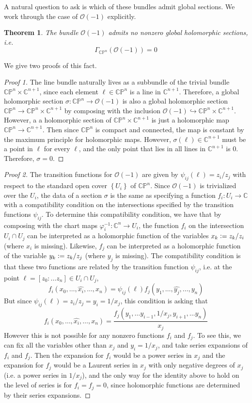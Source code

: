 \documentclass[psamsfonts, 12pt]{amsart}
\newtheorem{thm}{Theorem}[section]
\theoremstyle{definition}
\theoremstyle{remark}
\renewcommand{\O}{\mathscr{O}}
\newcommand{\C}{\mathbb{C}}
\newcommand{\CP}{\mathbb{CP}}
\newcommand{\inv}{^{-1}}
\newcommand{\set}[1]{\left\lbrace #1 \right\rbrace}
\newcommand{\defeq}{\vcentcolon=}
\begin{document}
A natural question to ask is which of these bundles admit global sections. We work
through the case of $\O(-1)$ explicitly.
%
\begin{thm}
The bundle $\O(-1)$ admits no nonzero global holomorphic sections, i.e.
\[
\Gamma_{\CP^n}(\O(-1)) = 0
\]
\end{thm}
%
We give two proofs of this fact.
%
\begin{proof}[Proof 1]
The line bundle naturally lives as a subbundle of the trivial bundle
$\CP^n \times \C^{n+1}$, since each element $\ell \in \CP^n$ is a line in
$\C^{n+1}$. Therefore, a global holomorphic section $\sigma : \CP^n \to \O(-1)$
is also a global holomorphic section $\CP^n \to \CP^n \times \C^{n+1}$ by composing
with the inclusion $\O(-1) \hookrightarrow \CP^n \times \C^{n+1}$. However,
a a holomorphic section of $\CP^n \times \C^{n+1}$ is just a holomorphic map
$\CP^n \to \C^{n+1}$. Then since $\CP^n$ is compact and connected, the map is constant by
the maximum principle for holomorphic maps. However, $\sigma(\ell) \in \C^{n+1}$ must
be a point in $\ell$ for every $\ell$, and the only point that lies in all lines
in $\C^{n+1}$ is $0$. Therefore, $\sigma = 0$.
\end{proof}
%
\begin{proof}[Proof 2]
The transition functions for $\O(-1)$ are given by $\psi_{ij}(\ell) = z_i/z_j$
with respect to the standard open cover $\set{U_i}$ of $\CP^n$. Since $\O(-1)$ is
trivialized over the $U_i$, the data of a section $\sigma$ is the same as specifying
a function $f_i : U_i \to \C$ with a compatibility condition on the intersections
specified by the transition functions $\psi_{ij}$. To determine this compatibility
condition, we have that by composing with the chart maps $\varphi_i\inv : \C^n \to U_i$,
the function $f_i$ on the intersection $U_i \cap U_j$ can be interpreted as
a holomorphic function of the variables $x_k \defeq z_k/z_i$ (where $x_i$ is missing).
Likewise, $f_j$ can be interpreted as a holomorphic function of the variable
$y_k \defeq z_k/z_j$ (where $y_j$ is missing). The compatibility condition is that these
two functions are related by the transition function $\psi_{ij}$, i.e. at the point
$\ell = [z_0: \ldots z_n] \in U_i \cap U_j$,
\[
f_i(x_0,\ldots,\widehat{x_i},\ldots, x_n) =
\psi_{ij}(\ell)f_j(y_1,\ldots, \widehat{y_j},\ldots, y_n)
\]
But since $\psi_{ij}(\ell) = z_i/z_j = y_i = 1/x_j$, this condition is asking that
\[
f_i(x_0,\ldots,\widehat{x_i},\ldots, x_n) =
\frac{f_j(y_1, \ldots y_{i-1}, 1/x_j, y_{i+1}, \ldots y_n)}{x_j}
\]
However this is not possible for any nonzero functions $f_i$ and $f_j$. To see
this, we can fix all the variables other than $x_j$ and $y_i = 1/x_j$, and take
series expansions of $f_i$ and $f_j$. Then the expansion for $f_i$ would be a power
series in $x_j$ and the expansion for $f_j$ would be a Laurent series in $x_j$ with
only negative degrees of $x_j$ (i.e. a power series in $1/x_j$), and the only way for
the identity above to hold on the level of series is for $f_i = f_j = 0$, since
holomorphic functions are determined by their series expansions.
\end{proof}
\end{document}
